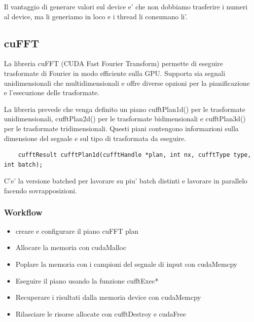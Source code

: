 Il vantaggio di generare valori sul device e' che non dobbiamo trasferire i numeri al device, ma li generiamo in loco e i thread li consumano li'.

\subsection{cuFFT}
La libreria cuFFT (CUDA Fast Fourier Transform) permette di eseguire trasformate di Fourier in modo efficiente sulla GPU. Supporta sia segnali unidimensionali che multidimensionali e offre diverse opzioni per la pianificazione e l'esecuzione delle trasformate.

La libreria prevede che venga definito un piano cufftPlan1d() per le trasformate unidimensionali, cufftPlan2d() per le trasformate bidimensionali e cufftPlan3d() per le trasformate tridimensionali. Questi piani contengono informazioni sulla dimensione del segnale e sul tipo di trasformata da eseguire.

\begin{lstlisting}
    cufftResult cufftPlan1d(cufftHandle *plan, int nx, cufftType type, int batch);
\end{lstlisting}
C'e' la versione batched per lavorare su piu' batch distinti e lavorare in parallelo facendo sovrapposizioni.

\subsubsection{Workflow}
\begin{itemize}
    \item creare e configurare il piano cuFFT plan
    \item Allocare la memoria con cudaMalloc
    \item Poplare la memoria con i campioni del segnale di input con cudaMemcpy
    \item Eseguire il piano usando la funzione cufftExec*
    \item Recuperare i risultati dalla memoria device con cudaMemcpy
    \item Rilasciare le risorse allocate con cufftDestroy e cudaFree
\end{itemize}

